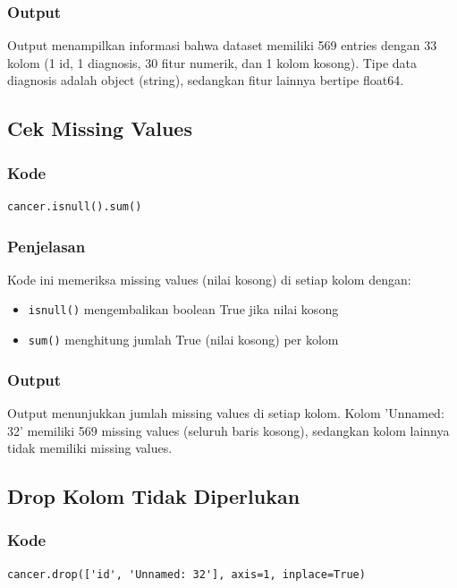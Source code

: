 \documentclass[12pt,a4paper]{article}
\begin{document}
\subsubsection{Output}
Output menampilkan informasi bahwa dataset memiliki 569 entries dengan 33 kolom (1 id, 1 diagnosis, 30 fitur numerik, dan 1 kolom kosong). Tipe data diagnosis adalah object (string), sedangkan fitur lainnya bertipe float64.

\subsection{Cek Missing Values}

\subsubsection{Kode}
\begin{lstlisting}[style=pythonstyle]
cancer.isnull().sum()
\end{lstlisting}

\subsubsection{Penjelasan}
Kode ini memeriksa missing values (nilai kosong) di setiap kolom dengan:
\begin{itemize}
    \item \texttt{isnull()} mengembalikan boolean True jika nilai kosong
    \item \texttt{sum()} menghitung jumlah True (nilai kosong) per kolom
\end{itemize}

\subsubsection{Output}
Output menunjukkan jumlah missing values di setiap kolom. Kolom 'Unnamed: 32' memiliki 569 missing values (seluruh baris kosong), sedangkan kolom lainnya tidak memiliki missing values.

\subsection{Drop Kolom Tidak Diperlukan}

\subsubsection{Kode}
\begin{lstlisting}[style=pythonstyle]
cancer.drop(['id', 'Unnamed: 32'], axis=1, inplace=True)
\end{lstlisting}
\end{document}
